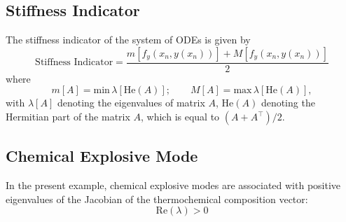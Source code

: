 \documentclass[12pt]{ussci}
\begin{document}
\subsection{Stiffness Indicator}
The stiffness indicator of the system of ODEs is given by
\begin{equation}
	\textrm{Stiffness Indicator} = \frac{m[f_y(x_n,y(x_n))] + M[f_y(x_n,y(x_n))]}{2}
\end{equation}
where
\begin{equation}
	m[A] = \textrm{min}\,\lambda[\textrm{He}(A)];\qquad M[A] = \textrm{max}\,\lambda[\textrm{He}(A)],
\end{equation}
with $\lambda [A]$ denoting the eigenvalues of matrix $A$, $\textrm{He}(A)$ denoting the Hermitian part of the matrix $A$, which is equal to $(A + A^\intercal ) / 2$.



\subsection{Chemical Explosive Mode}
In the present example, chemical explosive modes are associated with positive eigenvalues of the Jacobian of the thermochemical composition vector:
\begin{equation}
	\textrm{Re}(\lambda) > 0
\end{equation}
\end{document}
